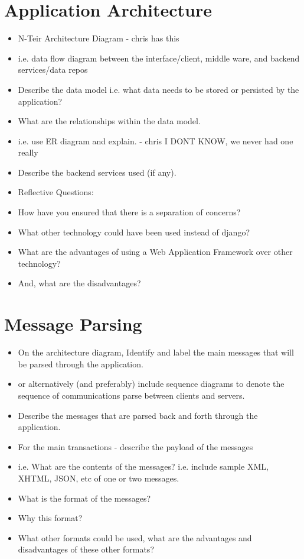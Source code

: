 \documentclass{sig-alt-release2}
\begin{document}
\section{Application Architecture}
\begin{itemize}

\item	N-Teir Architecture Diagram - chris has this
\item	i.e. data flow diagram between the interface/client, middle ware, and backend services/data repos

\item	Describe the data model i.e. what data needs to be stored or persisted by the application?

\item	What are the relationships within the data model.
\item	i.e. use ER diagram and explain. - chris I DONT KNOW, we never had one really

\item	Describe the backend services used (if any).

\item	Reflective Questions: 
\item	How have you ensured that there is a separation of concerns? 
\item	What other technology could have been used instead of django? 
\item	What are the advantages of using a Web Application Framework over other technology? 
\item	And, what are the disadvantages?
\end{itemize}

\section{Message Parsing}
\begin{itemize}

\item	On the architecture diagram, Identify and label the main messages that will be parsed through the application.
\item	or alternatively (and preferably) include sequence diagrams to denote the sequence of communications parse between clients and servers.

\item	Describe the messages that are parsed back and forth through the application.

\item	For the main transactions - describe the payload of the messages 
\item	i.e. What are the contents of the messages? i.e. include sample XML, XHTML, JSON, etc of one or two messages.

\item	What is the format of the messages? 

\item	Why this format? 

\item	What other formats could be used, what are the advantages and disadvantages of these other formats?
\end{itemize}
\end{document}
